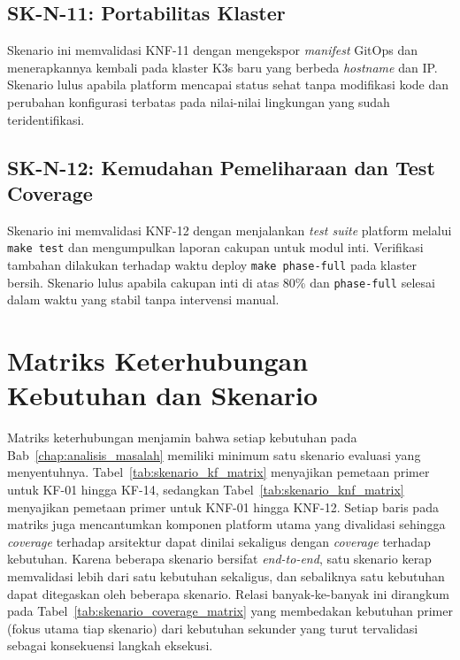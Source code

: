 \subsection{SK-N-11: Portabilitas Klaster}

Skenario ini memvalidasi KNF-11 dengan mengekspor \textit{manifest} GitOps dan menerapkannya kembali pada klaster K3s baru yang berbeda \textit{hostname} dan IP. Skenario lulus apabila platform mencapai status sehat tanpa modifikasi kode dan perubahan konfigurasi terbatas pada nilai-nilai lingkungan yang sudah teridentifikasi.

\subsection{SK-N-12: Kemudahan Pemeliharaan dan Test Coverage}

Skenario ini memvalidasi KNF-12 dengan menjalankan \textit{test suite} platform melalui \texttt{make test} dan mengumpulkan laporan cakupan untuk modul inti. Verifikasi tambahan dilakukan terhadap waktu deploy \texttt{make phase-full} pada klaster bersih. Skenario lulus apabila cakupan inti di atas 80\% dan \texttt{phase-full} selesai dalam waktu yang stabil tanpa intervensi manual.

\section{Matriks Keterhubungan Kebutuhan dan Skenario}
\label{sec:matriks_skenario}

Matriks keterhubungan menjamin bahwa setiap kebutuhan pada Bab~\ref{chap:analisis_masalah} memiliki minimum satu skenario evaluasi yang menyentuhnya. Tabel~\ref{tab:skenario_kf_matrix} menyajikan pemetaan primer untuk KF-01 hingga KF-14, sedangkan Tabel~\ref{tab:skenario_knf_matrix} menyajikan pemetaan primer untuk KNF-01 hingga KNF-12. Setiap baris pada matriks juga mencantumkan komponen platform utama yang divalidasi sehingga \textit{coverage} terhadap arsitektur dapat dinilai sekaligus dengan \textit{coverage} terhadap kebutuhan. Karena beberapa skenario bersifat \textit{end-to-end}, satu skenario kerap memvalidasi lebih dari satu kebutuhan sekaligus, dan sebaliknya satu kebutuhan dapat ditegaskan oleh beberapa skenario. Relasi banyak-ke-banyak ini dirangkum pada Tabel~\ref{tab:skenario_coverage_matrix} yang membedakan kebutuhan primer (fokus utama tiap skenario) dari kebutuhan sekunder yang turut tervalidasi sebagai konsekuensi langkah eksekusi.

